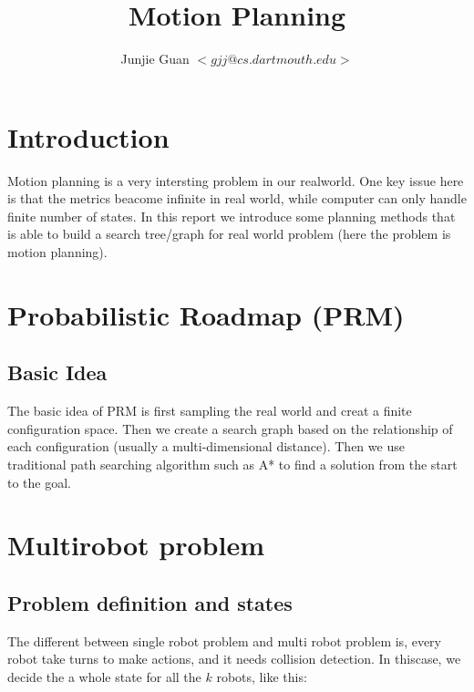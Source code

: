 \documentclass{article}
\title{Motion Planning}
\author{Junjie Guan $<gjj@cs.dartmouth.edu>$}
\begin{document}
\maketitle

\tableofcontents

\section{Introduction}

Motion planning is a very intersting problem in our realworld. One key issue here is that the metrics beacome infinite in real world, while computer can only handle finite number of states. In this report we introduce some planning methods that is able to build a search tree/graph for real world problem (here the problem is motion planning).

\clearpage
\section{Probabilistic Roadmap (PRM)}
\subsection{Basic Idea}

The basic idea of PRM is first sampling the real world and creat a finite configuration space. Then we create a search graph based on the relationship of each configuration (usually a multi-dimensional distance). Then we use traditional path searching algorithm such as A* to find a solution from the start to the goal.






\clearpage
\section{Multirobot problem}
\subsection{Problem definition and states}

The different between single robot problem and multi robot problem is, every robot take turns to make actions, and it needs collision detection. In thiscase, we decide the a whole state for all the $k$ robots, like this:
\end{document}
